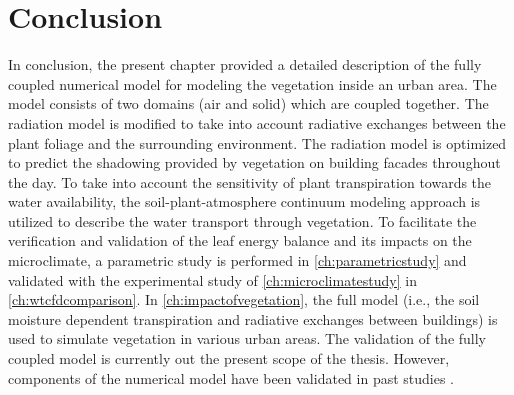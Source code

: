 \section{Conclusion}

In conclusion, the present chapter provided a detailed description of the fully coupled numerical model for modeling the vegetation inside an urban area. The model consists of two domains (air and solid) which are coupled together. The radiation model is modified to take into account radiative exchanges between the plant foliage and the surrounding environment. The radiation model is optimized to predict the shadowing provided by vegetation on building facades throughout the day. To take into account the sensitivity of plant transpiration towards the water availability, the soil-plant-atmosphere continuum modeling approach is utilized to describe the water transport through vegetation. To facilitate the verification and validation of the leaf energy balance and its impacts on the microclimate, a parametric study is performed in \cref{ch:parametricstudy} and validated with the experimental study of \cref{ch:microclimatestudy} in \cref{ch:wtcfdcomparison}. In \cref{ch:impactofvegetation}, the full model (i.e., the soil moisture dependent transpiration and radiative exchanges between buildings) is used to simulate vegetation in various urban areas. The validation of the fully coupled model is currently out the present scope of the thesis. However, components of the numerical model have been validated in past studies \citep{Kubilay2018}. 

